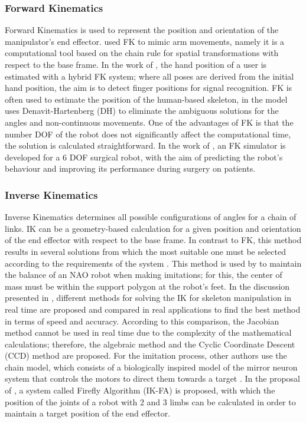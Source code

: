 \documentclass[thesis]{mas_proposal}
\begin{document}
    \subsubsection{Forward Kinematics}
    
    Forward Kinematics is used to represent the position and orientation of the manipulator's end effector. \cite{Assad2020} used FK to mimic arm movements, namely it is a computational tool based on the chain rule for spatial transformations with respect to the base frame. In the work of \cite{Malik2017}, the hand position of a user is estimated with a hybrid FK system; where all poses are derived from the initial hand position, the aim is to detect finger positions for signal recognition. FK is often used to estimate the position of the human-based skeleton, in \cite{Huang2022} the model uses Denavit-Hartenberg (DH) to eliminate the ambiguous solutions for the angles and non-continuous movements. One of the advantages of FK is that the number DOF of the robot does not significantly affect the computational time, the solution is calculated straightforward. In the work of \cite{Shao2015}, an FK simulator is developed for a 6 DOF surgical robot, with the aim of predicting the robot's behaviour and improving its performance during surgery on patients.
    
    \subsubsection{Inverse Kinematics}
    
    Inverse Kinematics determines all possible configurations of angles for a chain of links. IK can be a geometry-based calculation for a given position and orientation of the end effector with respect to the base frame. In contrast to FK, this method results in several solutions from which the most suitable one must be selected according to the requirements of the system \cite{Mueller2019}. This method is used by \cite{Koenemann2012, Koenemann2014} to maintain the balance of an NAO robot when making imitations; for this, the center of mass must be within the support polygon at the robot's feet. In the discussion presented in \cite{Martin2003}, different methods for solving the IK for skeleton manipulation in real time are proposed and compared in real applications to find the best method in terms of speed and accuracy. According to this comparison, the Jacobian method cannot be used in real time due to the complexity of the mathematical calculations; therefore, the algebraic method and the Cyclic Coordinate Descent (CCD) method are proposed. For the imitation process, other authors use the chain model, which consists of a biologically inspired model of the mirror neuron system that controls the motors to direct them towards a target \cite{Chersi2012}. In the proposal of \cite{Rokbani2014}, a system called Firefly Algorithm (IK-FA) is proposed, with which the position of the joints of a robot with 2 and 3 limbs can be calculated in order to maintain a target position of the end effector.
    
\end{document}
